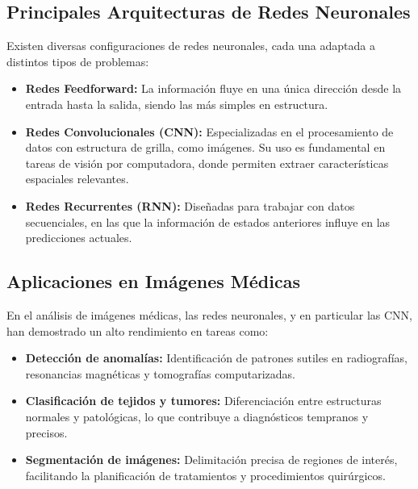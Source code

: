 \documentclass[11pt,spanish,listoffigures,listoftables]{tfgetsinf}
\begin{document}
\subsection{Principales Arquitecturas de Redes Neuronales}
Existen diversas configuraciones de redes neuronales, cada una adaptada a distintos tipos de problemas:
\begin{itemize}
    \item \textbf{Redes Feedforward:} La información fluye en una única dirección desde la entrada hasta la salida, siendo las más simples en estructura.
    \item \textbf{Redes Convolucionales (CNN):} Especializadas en el procesamiento de datos con estructura de grilla, como imágenes. Su uso es fundamental en tareas de visión por computadora, donde permiten extraer características espaciales relevantes.
    \item \textbf{Redes Recurrentes (RNN):} Diseñadas para trabajar con datos secuenciales, en las que la información de estados anteriores influye en las predicciones actuales.
\end{itemize}

\subsection{Aplicaciones en Imágenes Médicas}
En el análisis de imágenes médicas, las redes neuronales, y en particular las CNN, han demostrado un alto rendimiento en tareas como:
\begin{itemize}
    \item \textbf{Detección de anomalías:} Identificación de patrones sutiles en radiografías, resonancias magnéticas y tomografías computarizadas.
    \item \textbf{Clasificación de tejidos y tumores:} Diferenciación entre estructuras normales y patológicas, lo que contribuye a diagnósticos tempranos y precisos.
    \item \textbf{Segmentación de imágenes:} Delimitación precisa de regiones de interés, facilitando la planificación de tratamientos y procedimientos quirúrgicos.
\end{itemize}
\end{document}
